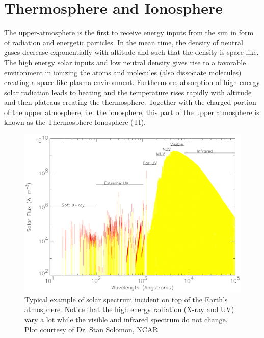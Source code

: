 \section{Thermosphere and Ionosphere}

The upper-atmosphere is the first to receive energy inputs from the sun in form of radiation and energetic particles. In the mean time, the density of neutral gases decrease exponentially with altitude and such that the density is space-like. The high energy solar inputs and low neutral density gives rise to a favorable environment in ionizing the atoms and molecules (also dissociate molecules) creating a space like plasma environment. Furthermore, absorption of high energy solar radiation leads to heating and the temperature rises rapidly with altitude and then plateaus creating the thermosphere. Together with the charged portion of the upper atmosphere, i.e. the ionosphere, this part of the upper atmosphere is known as the Thermosphere-Ionosphere (TI).
\begin{figure}[t]
	\centering\includegraphics[width=35pc]{solar_spec.png}
	\caption{Typical example of solar spectrum incident on top of the Earth's atmosphere. Notice that the high energy radiation (X-ray and UV) vary a lot while the visible and infrared spectrum do not change. Plot courtesy of Dr. Stan Solomon, NCAR }
	\label{fig:solar_spec}
\end{figure}
